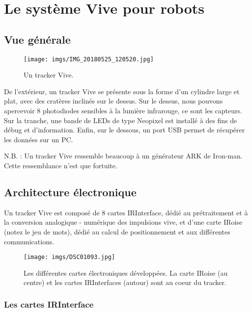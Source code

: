﻿\chapter{Le système Vive pour robots}

\section{Vue générale}

\begin{figure}[ht]
\begin{center}
\texttt{[image: imgs/IMG\_20180525\_120520.jpg]}
\end{center}
\caption{Un tracker Vive.}
\end{figure}

De l'extérieur, un tracker Vive se présente sous la forme d'un cylindre large et plat, avec des cratères inclinés sur le dessus. Sur le dessus, nous pouvons apercevoir 8 photodiodes sensibles à la lumière infrarouge, ce sont les capteurs. Sur la tranche, une bande de LEDs de type Neopixel est installé à des fins de débug et d'information. Enfin, sur le dessous, un port USB permet de récupérer les données sur un PC.

N.B. : Un tracker Vive ressemble beaucoup à un générateur ARK de Iron-man. Cette ressemblance n'est que fortuite.

\section{Architecture électronique}

Un tracker Vive est composé de 8 cartes IRInterface, dédié au prétraitement et à la conversion analogique - numérique des impulsions vive, et d'une carte IRoise (notez le jeu de mots), dédié au calcul de positionnement et aux différentes communications.

\begin{figure}[ht]
\begin{center}
\texttt{[image: imgs/DSC01093.jpg]}
\end{center}
\caption{Les différentes cartes électroniques développées. La carte IRoise (au centre) et les cartes IRInterfaces (autour) sont au coeur du tracker.}
\end{figure}

\subsection{Les cartes IRInterface}

